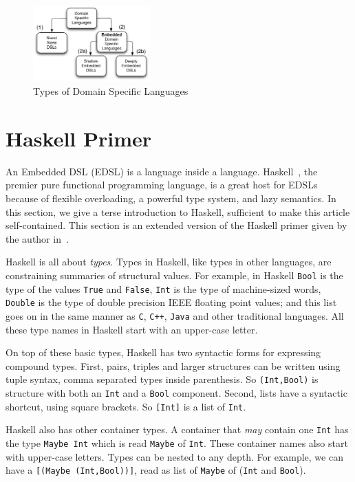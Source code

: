 \documentclass[11pt]{article}
\begin{document}
\begin{figure}[!t]
  \centering        
  \includegraphics[width=0.4\textwidth]{images/TypesOfDSLs.pdf}
  \caption{Types of Domain Specific Languages}
  \label{fig:types-of-dsls}
\end{figure}
        
\section{Haskell Primer}

An Embedded DSL (EDSL) is a language inside a language.
Haskell~\cite{Haskell98Book}, the premier pure functional programming language, is a great host for EDSLs
because of flexible overloading, a powerful type system, and lazy semantics.
In this section, we give a terse
introduction to Haskell, 
sufficient to make this article self-contained. This section
is an extended version of the Haskell primer given by the author in~\cite{Gill:11:Declarative}.

Haskell is all about {\em types\/}. Types in Haskell, like
types in other languages, are constraining summaries of structural values.
For example, in Haskell \verb|Bool| is the type of the values
\verb|True| and \verb|False|, \verb|Int| is the type of machine-sized
words, \verb|Double| is the type of double precision IEEE floating
point values; and this list goes on in the same manner as
\verb|C|, \verb|C++|, \verb|Java| and other traditional languages.
All these type names in Haskell start with an upper-case letter.

On top of these basic types, Haskell has two syntactic forms for expressing
compound types.
First, pairs, triples and larger structures can be written using tuple syntax,
comma separated types inside parenthesis.
So \verb|(Int,Bool)| is structure with both an \verb|Int| and a \verb|Bool| component.
Second, lists have a syntactic shortcut, using square brackets.
So \verb|[Int]| is a list of \verb|Int|.

Haskell also has other container types. A container
that {\em may\/} contain one \verb|Int| has the type
\verb|Maybe Int|
which is read \verb|Maybe| of \verb|Int|.
These container names also start with upper-case letters.
Types can be nested to any depth. For example, we can have a \verb|[(Maybe (Int,Bool))]|,
read as list of \verb|Maybe| of (\verb|Int| and \verb|Bool|).
\end{document}
